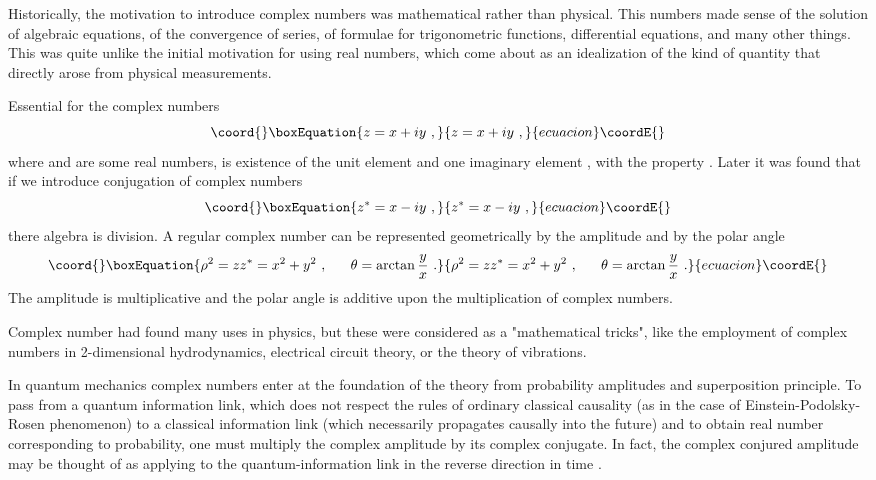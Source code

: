 \documentclass[a4paper,12pt]{article}
\begin{document}
Historically, the motivation to introduce complex numbers was mathematical rather than physical. 
This numbers made sense of the solution of algebraic equations, of the convergence of series, 
of formulae for trigonometric functions, differential equations, and many other things. This 
was quite unlike the initial motivation for using real numbers, which come about as an 
idealization of the kind of quantity that directly arose from physical measurements. 

Essential for the complex numbers 
\begin{equation}\coord{}\boxEquation{ \label{z}
z= x + iy ~,
}{ z= x + iy ~,
}{ecuacion}\coordE{}\end{equation}
where \coordHE{} and \coordHE{} are some real numbers, is existence of the unit element and one imaginary 
element \coordHE{}, with the property \coordHE{}. Later it was found that if we introduce conjugation 
of complex numbers 
\begin{equation}\coord{}\boxEquation{ \label{z*}
z^* = x - iy ~,
}{ z^* = x - iy ~,
}{ecuacion}\coordE{}\end{equation}
there algebra is division. A regular complex number can be represented geometrically by the 
amplitude and by the polar angle
\begin{equation}\coord{}\boxEquation{ \label{Nz}
\rho^2 = zz^* = x^2 + y^2 ~, ~~~~~ \theta = \arctan{\frac{y}{x}} ~. 
}{ \rho^2 = zz^* = x^2 + y^2 ~, ~~~~~ \theta = \arctan{\frac{y}{x}} ~. 
}{ecuacion}\coordE{}\end{equation}
The amplitude \myHighlight{$\rho $}\coordHE{} is multiplicative and the polar angle \myHighlight{$\theta$}\coordHE{} is additive upon the 
multiplication of complex numbers. 

Complex number had found many uses in physics, but these were considered as a "mathematical 
tricks", like the employment of complex numbers in 2-dimensional hydrodynamics, electrical 
circuit theory, or the theory of vibrations. 

In quantum mechanics complex numbers enter at the foundation of the theory from probability 
amplitudes and superposition principle. To pass from a quantum information link, which does 
not respect the rules of ordinary classical causality (as in the case of Einstein-Podolsky-Rosen 
phenomenon) to a classical information link (which necessarily propagates causally into the 
future) and to obtain real number corresponding to probability, one must multiply the complex 
amplitude by its complex conjugate. In fact, the complex conjured amplitude may be thought of 
as applying to the quantum-information link in the reverse direction in time \cite{Pe}. 
\end{document}
